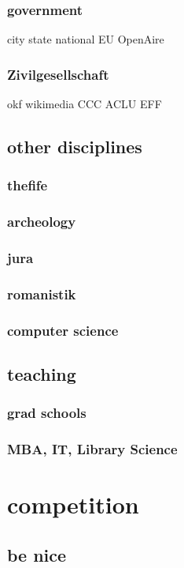 \documentclass[output=guidelines,guidelines] {langscibook}
\begin{document}
\subsubsection{government}
                    city 
                    state
                    national
                    EU
                        OpenAire
\subsubsection{Zivilgesellschaft}
                    okf
                    wikimedia
                    CCC
                    ACLU
                    EFF
\subsection{other disciplines}
\subsubsection{thefife}
\subsubsection{archeology}
\subsubsection{jura}
\subsubsection{romanistik}
\subsubsection{computer science}
\subsection{teaching}
\subsubsection{grad schools}
\subsubsection{MBA, IT, Library Science}
\section{competition}
\subsection{be nice}
\end{document}
